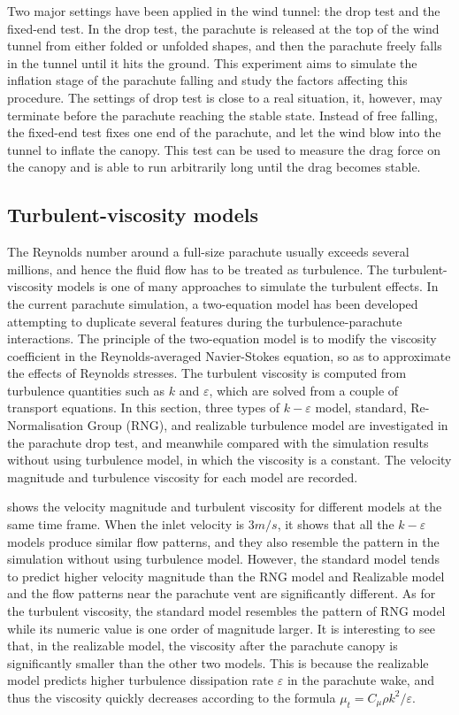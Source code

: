 Two major settings have been applied in the wind tunnel: the drop test and the fixed-end test. In the drop test, the parachute is released at the top of the wind tunnel from either folded or unfolded shapes, and then the parachute freely falls in the tunnel until it hits the ground. This experiment aims to simulate the inflation stage of the parachute falling and study the factors affecting this procedure. The settings of drop test is close to a real situation, it, however, may terminate before the parachute reaching the stable state. Instead of free falling, the fixed-end test fixes one end of the parachute, and let the wind blow into the tunnel to inflate the canopy. This test can be used to measure the drag force on the canopy and is able to run arbitrarily long until the drag becomes stable.
  
\subsection{Turbulent-viscosity models}
The Reynolds number around a full-size parachute usually exceeds several millions, and hence the fluid flow has to be treated as turbulence. The turbulent-viscosity models is one of many approaches to simulate the turbulent effects. In the current parachute simulation, a two-equation model has been developed attempting to duplicate several features during the turbulence-parachute interactions. The principle of the two-equation model is to modify the viscosity coefficient in the Reynolds-averaged Navier-Stokes equation, so as to approximate the effects of Reynolds stresses. The turbulent viscosity is computed from turbulence quantities such as $k$ and $\varepsilon$, which are solved from a couple of transport equations. In this section, three types of $k-\varepsilon$ model, standard, Re-Normalisation Group (RNG), and realizable turbulence model are investigated in the parachute drop test, and meanwhile compared with the simulation results without using turbulence model, in which the viscosity is a constant. The velocity magnitude and turbulence viscosity for each model are recorded. 

 shows the velocity magnitude and turbulent viscosity for different models at the same time frame. When the inlet velocity is $3m/s$, it shows that all the $k-\varepsilon$ models produce similar flow patterns, and they also resemble the pattern in the simulation without using turbulence model. However, the standard model tends to predict higher velocity magnitude than the RNG model and Realizable model and the flow patterns near the parachute vent are significantly different. As for the turbulent viscosity, the standard model resembles the pattern of RNG model while its numeric value is one order of magnitude larger. It is interesting to see that, in the realizable model, the viscosity after the parachute canopy is significantly smaller than the other two models. This is because the realizable model predicts higher turbulence dissipation rate $\varepsilon$ in the parachute wake, and thus the viscosity quickly decreases according to the formula $\mu_{t} = C_{\mu}\rho k^2/\varepsilon$.

